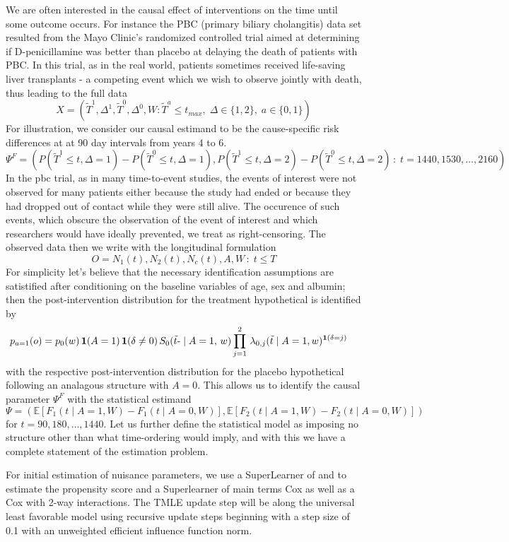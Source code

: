 \documentclass{report}
\newcommand{\1}{\ensuremath{\mathbf{1}}}
\newcommand{\T}{\ensuremath{\widetilde{T}}}
\renewcommand{\t}{\ensuremath{\Tilde{t}}}
\renewcommand{\L}{\ensuremath{W}}
\renewcommand{\l}{\ensuremath{w}}
\begin{document}
We are often interested in the causal effect of interventions on the time until some outcome occurs. For instance the PBC (primary biliary cholangitis) data set resulted from the Mayo Clinic's randomized controlled trial aimed at determining if D-penicillamine was better than placebo at delaying the death of patients with PBC. In this trial, as in the real world, patients sometimes received life-saving liver transplants - a competing event which we wish to observe jointly with death, thus leading to the full data
\[ X = (\T^1, \Delta^1, \T^0, \Delta^0, \L : \T^a \leq t_{max},\; \Delta \in \{1, 2\},\; a \in \{0, 1\})\]
For illustration, we consider our causal estimand to be the cause-specific risk differences at at 90 day intervals from years 4 to 6.
\[ \Psi^F = \left(P(\T^1 \leq t, \Delta = 1) - P(\T^0 \leq t, \Delta = 1), P(\T^1 \leq t, \Delta = 2) - P(\T^0 \leq t, \Delta = 2) \,:\; t = 1440, 1530, \dots, 2160\right) \]
In the pbc trial, as in many time-to-event studies, the events of interest were not observed for many patients either because the study had ended or because they had dropped out of contact while they were still alive. The occurence of such events, which obscure the observation of the event of interest and which researchers would have ideally prevented, we treat as right-censoring. The observed data then we write with the longitudinal formulation
\[ O = N_1(t), N_2(t), N_c(t), A, \L \,:\; t \leq T \]
For simplicity let's believe that the necessary identification assumptions are satistified after conditioning on the baseline variables of age, sex and albumin; then the post-intervention distribution for the treatment hypothetical is identified by
\begin{align*}
p_{a=1}(o) = p_{0}(\l) \, &\1(A = 1) \, \1(\delta \neq 0) \,S_{0}(\t\text{-} \mid A = 1,\, \l)\prod_{j=1}^{2} \, \lambda_{0,j}(\t \mid A = 1, \l)^{\1(\delta = j)}
\end{align*}
with the respective post-intervention distribution for the placebo hypothetical following an analagous structure with \(A = 0\). This allows us to identify the causal parameter \(\Psi^F\) with the statistical estimand
\[ \Psi = (\mathbb{E}\left[F_1(t \mid A = 1, \L) - F_1(t \mid A = 0, \L)\right], \mathbb{E}\left[F_2(t \mid A = 1, \L) - F_2(t \mid A = 0, \L)\right]) \]
for \(t = 90, 180, \dots, 1440\).
Let us further define the statistical model as imposing no structure other than what time-ordering would imply, and with this we have a complete statement of the estimation problem.

For initial estimation of nuisance parameters, we use a SuperLearner of  and  to estimate the propensity score and a Superlearner of main terms Cox as well as a Cox with 2-way interactions. The TMLE update step will be along the universal least favorable model using recursive update steps beginning with a step size of 0.1 with an unweighted efficient influence function norm.
\end{document}

